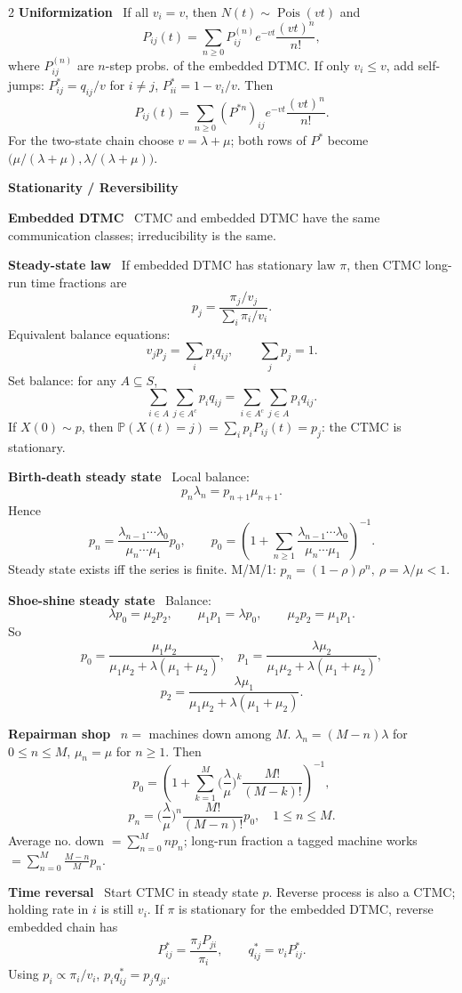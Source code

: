 \documentclass[10pt,fleqn]{article}
\newcommand{\PP}{\mathbb{P}}
\newcommand{\shead}[1]{\vspace{0.05ex}\textbf{\scriptsize #1}\par}
\newcommand{\topic}[1]{\textbf{#1}\ }
\DeclareMathOperator{\Pois}{Pois}
\begin{document}
\begin{multicols*}{2}
\topic{Uniformization} If all \(v_i=v\), then \(N(t)\sim\Pois(vt)\) and
\[
P_{ij}(t)=\sum_{n\ge0}P^{(n)}_{ij}e^{-vt}\frac{(vt)^n}{n!},
\]
where \(P^{(n)}_{ij}\) are \(n\)-step probs. of the embedded DTMC. If only \(v_i\le v\), add self-jumps: \(P^*_{ij}=q_{ij}/v\) for \(i\ne j\), \(P^*_{ii}=1-v_i/v\). Then
\[
P_{ij}(t)=\sum_{n\ge0}(P^{*n})_{ij}e^{-vt}\frac{(vt)^n}{n!}.
\]
For the two-state chain choose \(v=\lambda+\mu\); both rows of \(P^*\) become \(\big(\mu/(\lambda+\mu),\lambda/(\lambda+\mu)\big)\).

\shead{Stationarity / Reversibility}
\topic{Embedded DTMC} CTMC and embedded DTMC have the same communication classes; irreducibility is the same.

\topic{Steady-state law} If embedded DTMC has stationary law \(\pi\), then CTMC long-run time fractions are
\[
p_j=\frac{\pi_j/v_j}{\sum_i \pi_i/v_i}.
\]
Equivalent balance equations:
\[
v_jp_j=\sum_i p_iq_{ij},\qquad \sum_j p_j=1.
\]
Set balance: for any \(A\subseteq S\),
\[
\sum_{i\in A}\sum_{j\in A^c}p_iq_{ij}=
\sum_{i\in A^c}\sum_{j\in A}p_iq_{ij}.
\]
If \(X(0)\sim p\), then \(\PP(X(t)=j)=\sum_i p_iP_{ij}(t)=p_j\): the CTMC is stationary.

\topic{Birth-death steady state} Local balance:
\[
p_n\lambda_n=p_{n+1}\mu_{n+1}.
\]
Hence
\[
p_n=\frac{\lambda_{n-1}\cdots\lambda_0}{\mu_n\cdots\mu_1}p_0,\qquad
p_0=\left(1+\sum_{n\ge1}\frac{\lambda_{n-1}\cdots\lambda_0}{\mu_n\cdots\mu_1}\right)^{-1}.
\]
Steady state exists iff the series is finite. M/M/1: \(p_n=(1-\rho)\rho^n,\ \rho=\lambda/\mu<1\).

\topic{Shoe-shine steady state} Balance:
\[
\lambda p_0=\mu_2p_2,\qquad \mu_1p_1=\lambda p_0,\qquad \mu_2p_2=\mu_1p_1.
\]
So
\[
p_0=\frac{\mu_1\mu_2}{\mu_1\mu_2+\lambda(\mu_1+\mu_2)},\quad
p_1=\frac{\lambda\mu_2}{\mu_1\mu_2+\lambda(\mu_1+\mu_2)},
\]
\[
p_2=\frac{\lambda\mu_1}{\mu_1\mu_2+\lambda(\mu_1+\mu_2)}.
\]

\topic{Repairman shop} \(n=\) machines down among \(M\). \(\lambda_n=(M-n)\lambda\) for \(0\le n\le M\), \(\mu_n=\mu\) for \(n\ge1\). Then
\[
p_0=\left(1+\sum_{k=1}^M\Big(\frac{\lambda}{\mu}\Big)^k\frac{M!}{(M-k)!}\right)^{-1},
\]
\[
p_n=\Big(\frac{\lambda}{\mu}\Big)^n\frac{M!}{(M-n)!}p_0,\quad 1\le n\le M.
\]
Average no. down \(=\sum_{n=0}^Mn p_n\); long-run fraction a tagged machine works \(=\sum_{n=0}^M \frac{M-n}{M}p_n\).

\topic{Time reversal} Start CTMC in steady state \(p\). Reverse process is also a CTMC; holding rate in \(i\) is still \(v_i\). If \(\pi\) is stationary for the embedded DTMC, reverse embedded chain has
\[
P^*_{ij}=\frac{\pi_jP_{ji}}{\pi_i},\qquad q^*_{ij}=v_iP^*_{ij}.
\]
Using \(p_i\propto \pi_i/v_i\), \(p_iq^*_{ij}=p_jq_{ji}\).


\end{multicols*}
\end{document}
